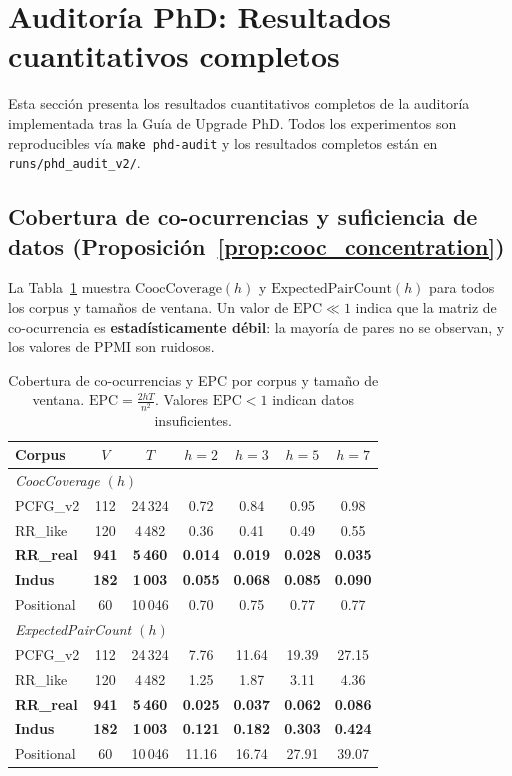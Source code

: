 \documentclass[11pt,a4paper]{article}
\newcommand{\1}{\mathbf{1}}
\numberwithin{equation}{section}
\begin{document}
\section{Auditoría PhD: Resultados cuantitativos completos}
\label{sec:phd_audit}

Esta sección presenta los resultados cuantitativos completos de la auditoría implementada tras la Guía de Upgrade PhD. Todos los experimentos son reproducibles vía \texttt{make phd-audit} y los resultados completos están en \texttt{runs/phd\_audit\_v2/}.

\subsection{Cobertura de co-ocurrencias y suficiencia de datos (Proposición~\ref{prop:cooc_concentration})}

La Tabla~\ref{tab:coverage} muestra $\mathrm{CoocCoverage}(h)$ y $\mathrm{ExpectedPairCount}(h)$ para todos los corpus y tamaños de ventana. Un valor de $\mathrm{EPC} \ll 1$ indica que la matriz de co-ocurrencia es \textbf{estadísticamente débil}: la mayoría de pares no se observan, y los valores de PPMI son ruidosos.

\begin{table}[h]
\centering
\caption{Cobertura de co-ocurrencias y EPC por corpus y tamaño de ventana. $\mathrm{EPC} = \frac{2hT}{n^2}$. Valores $\mathrm{EPC} < 1$ indican datos insuficientes.}
\label{tab:coverage}
\begin{tabular}{lcccccc}
\toprule
Corpus & $V$ & $T$ & $h=2$ & $h=3$ & $h=5$ & $h=7$ \\
\midrule
\multicolumn{7}{l}{\textit{CoocCoverage $(h)$}} \\
PCFG\_v2 & 112 & 24\,324 & 0.72 & 0.84 & 0.95 & 0.98 \\
RR\_like & 120 & 4\,482 & 0.36 & 0.41 & 0.49 & 0.55 \\
\textbf{RR\_real} & \textbf{941} & \textbf{5\,460} & \textbf{0.014} & \textbf{0.019} & \textbf{0.028} & \textbf{0.035} \\
\textbf{Indus} & \textbf{182} & \textbf{1\,003} & \textbf{0.055} & \textbf{0.068} & \textbf{0.085} & \textbf{0.090} \\
Positional & 60 & 10\,046 & 0.70 & 0.75 & 0.77 & 0.77 \\
\midrule
\multicolumn{7}{l}{\textit{ExpectedPairCount $(h)$}} \\
PCFG\_v2 & 112 & 24\,324 & 7.76 & 11.64 & 19.39 & 27.15 \\
RR\_like & 120 & 4\,482 & 1.25 & 1.87 & 3.11 & 4.36 \\
\textbf{RR\_real} & \textbf{941} & \textbf{5\,460} & \textbf{0.025} & \textbf{0.037} & \textbf{0.062} & \textbf{0.086} \\
\textbf{Indus} & \textbf{182} & \textbf{1\,003} & \textbf{0.121} & \textbf{0.182} & \textbf{0.303} & \textbf{0.424} \\
Positional & 60 & 10\,046 & 11.16 & 16.74 & 27.91 & 39.07 \\
\bottomrule
\end{tabular}
\end{table}
\end{document}
